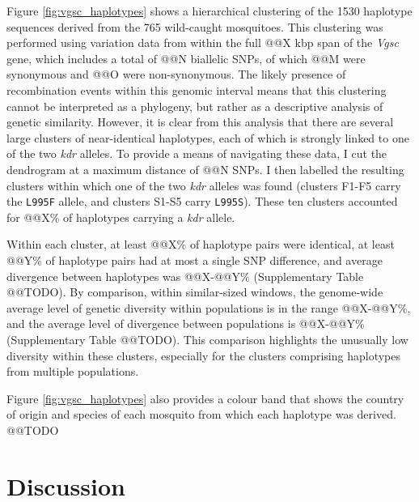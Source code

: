 \documentclass[a4paper,11pt,abstracton,hidelinks]{scrartcl}
\newcommand{\vgsc}{\textit{Vgsc}\xspace}
\begin{document}


Figure \ref{fig:vgsc_haplotypes} shows a hierarchical clustering of the 1530 haplotype sequences derived from the 765 wild-caught mosquitoes.
%
This clustering was performed using variation data from within the full @@X kbp span of the \vgsc gene, which includes a total of @@N biallelic SNPs, of which @@M were synonymous and @@O were non-synonymous. 
%
The likely presence of recombination events within this genomic interval means that this clustering cannot be interpreted as a phylogeny, but rather as a descriptive analysis of genetic similarity.
%
However, it is clear from this analysis that there are several large clusters of near-identical haplotypes, each of which is strongly linked to one of the two \textit{kdr} alleles.
%
To provide a means of navigating these data, I cut the dendrogram at a maximum distance of @@N SNPs.
%
I then labelled the resulting clusters within which one of the two \textit{kdr} alleles was found (clusters F1-F5 carry the \texttt{L995F} allele, and clusters S1-S5 carry \texttt{L995S}).
%
These ten clusters accounted for @@X\% of haplotypes carrying a \textit{kdr} allele.


%
Within each cluster, at least @@X\% of haplotype pairs were identical, at least @@Y\% of haplotype pairs had at most a single SNP difference, and average divergence between haplotypes was @@X-@@Y\% (Supplementary Table @@TODO).
%
By comparison, within similar-sized windows, the genome-wide average level of genetic diversity within populations is in the range @@X-@@Y\%, and the average level of divergence between populations is @@X-@@Y\% (Supplementary Table @@TODO).
%
This comparison highlights the unusually low diversity within these clusters, especially for the clusters comprising haplotypes from multiple populations.
%


%
Figure \ref{fig:vgsc_haplotypes} also provides a colour band that shows the country of origin and species of each mosquito from which each haplotype was derived.
%
@@TODO


\section*{Discussion}
\end{document}

